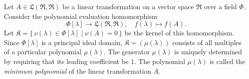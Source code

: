 Let $A \in \mathfrak{L}(\mathfrak{R}, \mathfrak{R})$ be a linear transformation on a vector space $\mathfrak{R}$ over a field $\Phi$. Consider the polynomial evaluation homomorphism
$$\Phi[\lambda] \to \mathfrak{L}(\mathfrak{R}, \mathfrak{R}), \quad f(\lambda) \mapsto f(A).$$
Let $\mathfrak{K} = \{\, \nu(\lambda) \in \Phi[\lambda] \mid \nu(A) = 0 \,\}$ be the kernel of this homomorphism. Since $\Phi[\lambda]$ is a principal ideal domain, $\mathfrak{K} = (\mu(\lambda))$ consists of all multiples of a particular polynomial $\mu(\lambda)$. The generator $\mu(\lambda)$ is uniquely determined by requiring that its leading coefficient be $1$. The polynomial $\mu(\lambda)$ is called the \textit{minimum polynomial} of the linear transformation $A$.
